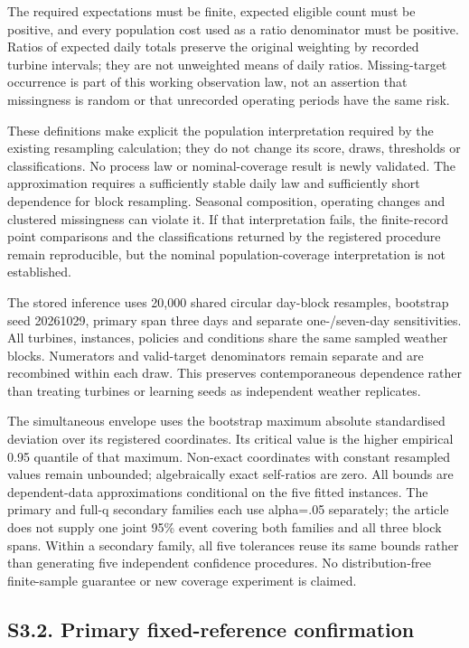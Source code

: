 \documentclass[
  british,
  11pt,
]{article}
\begin{document}
The required expectations must be finite, expected eligible count must
be positive, and every population cost used as a ratio denominator must
be positive. Ratios of expected daily totals preserve the original
weighting by recorded turbine intervals; they are not unweighted means
of daily ratios. Missing-target occurrence is part of this working
observation law, not an assertion that missingness is random or that
unrecorded operating periods have the same risk.

These definitions make explicit the population interpretation required
by the existing resampling calculation; they do not change its score,
draws, thresholds or classifications. No process law or nominal-coverage
result is newly validated. The approximation requires a sufficiently
stable daily law and sufficiently short dependence for block resampling.
Seasonal composition, operating changes and clustered missingness can
violate it. If that interpretation fails, the finite-record point
comparisons and the classifications returned by the registered procedure
remain reproducible, but the nominal population-coverage interpretation
is not established.

The stored inference uses 20,000 shared circular day-block resamples,
bootstrap seed 20261029, primary span three days and separate
one-/seven-day sensitivities. All turbines, instances, policies and
conditions share the same sampled weather blocks. Numerators and
valid-target denominators remain separate and are recombined within each
draw. This preserves contemporaneous dependence rather than treating
turbines or learning seeds as independent weather replicates.

The simultaneous envelope uses the bootstrap maximum absolute
standardised deviation over its registered coordinates. Its critical
value is the higher empirical 0.95 quantile of that maximum. Non-exact
coordinates with constant resampled values remain unbounded;
algebraically exact self-ratios are zero. All bounds are dependent-data
approximations conditional on the five fitted instances. The primary and
full-q secondary families each use alpha=.05 separately; the article
does not supply one joint 95\% event covering both families and all
three block spans. Within a secondary family, all five tolerances reuse
its same bounds rather than generating five independent confidence
procedures. No distribution-free finite-sample guarantee or new coverage
experiment is claimed.

\subsection{S3.2. Primary fixed-reference
confirmation}\label{s3.2.-primary-fixed-reference-confirmation}
\end{document}

